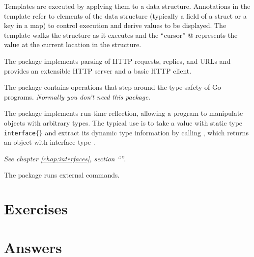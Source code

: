 \begin{description}
{Templates are executed by applying them to a data structure.  Annotations in
the template refer to elements of the data structure (typically a field of a
struct or a key in a map) to control execution and derive values to be
displayed.  The template walks the structure as it executes and the ``cursor'' @
represents the value at the current location in the structure.
}
\item[\package{net/http}]{
The  package implements parsing of HTTP requests, replies,
and URLs and provides an extensible HTTP server and a basic
HTTP client.
}
\item[\package{unsafe}]{
The  package contains operations that step around the type safety of Go programs.
\emph{Normally you don't need this package.}
}
\item[\package{reflect}]{
The  package implements run-time reflection, allowing a program to
manipulate objects with arbitrary types.  The typical use is to take a
value with static type \lstinline|interface{}| and extract its dynamic type
information by calling , which returns an object with interface
type .

\emph{See chapter \ref{chap:interfaces}, 
section ``''}.
}
\item[\package{os/exec}]{
The  package runs external commands.
}
\end{description}

\section{Exercises}




\cleardoublepage
\section{Answers}
\shipoutAnswer
